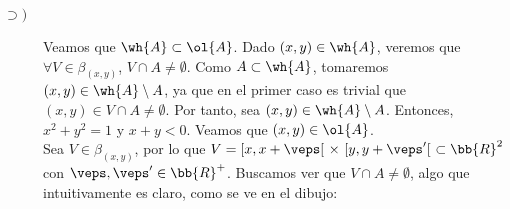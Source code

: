 \documentclass[12pt]{article}
\begin{document}
\begin{ejercicio}
\begin{enumerate}
\begin{description}
                \item[$\supset)$] Veamos que $\wh{A}\subset \ol{A}$. Dado $(x,y)\in \wh{A}$, veremos que $\forall V\in \beta_{(x,y)}$, $V\cap A\neq \emptyset$.
                Como $A\subset \wh{A}$, tomaremos $(x,y)\in \wh{A}\setminus A$, ya que en el primer caso es trivial que $(x,y)\in V\cap A\neq \emptyset$.
                Por tanto, sea $(x,y)\in \wh{A}\setminus A$. Entonces, $x^2+y^2=1$ y $x+y<0$. Veamos que $(x,y)\in \ol{A}$.\\

                Sea $V\in \beta_{(x,y)}$, por lo que $V=[x,x+\veps[~\times~[y,y+\veps'[~\subset \bb{R}^2$ con $\veps,\veps'\in \bb{R}^+$.
                Buscamos ver que $V\cap A\neq \emptyset$, algo que intuitivamente es claro, como se ve en el dibujo:
                \begin{figure}[H]
                    \centering
\end{figure}
\end{description}
\end{enumerate}
\end{ejercicio}
\end{document}
